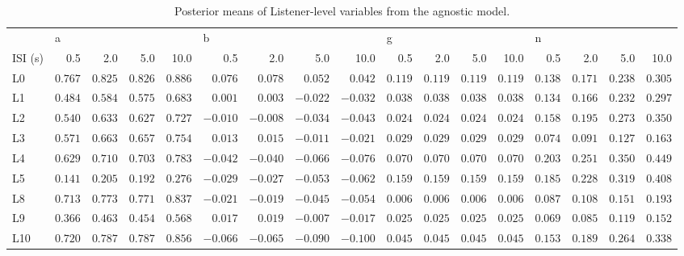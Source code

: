 \begin{table} \centering \caption{Posterior means of Listener-level variables from the agnostic model.} \label{vars} \begin{tabular}{lrrrrrrrrrrrrrrrr} \toprule {} & \multicolumn{4}{l}{a} & \multicolumn{4}{l}{b} & \multicolumn{4}{l}{g} & \multicolumn{4}{l}{n} \\ ISI (s) & 0.5 & 2.0 & 5.0 & 10.0 & 0.5 & 2.0 & 5.0 & 10.0 & 0.5 & 2.0 & 5.0 & 10.0 & 0.5 & 2.0 & 5.0 & 10.0 \\ \midrule L0 & $0.767$ & $0.825$ & $0.826$ & $0.886$ & $0.076$ & $0.078$ & $0.052$ & $0.042$ & $0.119$ & $0.119$ & $0.119$ & $0.119$ & $0.138$ & $0.171$ & $0.238$ & $0.305$ \\ L1 & $0.484$ & $0.584$ & $0.575$ & $0.683$ & $0.001$ & $0.003$ & $-0.022$ & $-0.032$ & $0.038$ & $0.038$ & $0.038$ & $0.038$ & $0.134$ & $0.166$ & $0.232$ & $0.297$ \\ L2 & $0.540$ & $0.633$ & $0.627$ & $0.727$ & $-0.010$ & $-0.008$ & $-0.034$ & $-0.043$ & $0.024$ & $0.024$ & $0.024$ & $0.024$ & $0.158$ & $0.195$ & $0.273$ & $0.350$ \\ L3 & $0.571$ & $0.663$ & $0.657$ & $0.754$ & $0.013$ & $0.015$ & $-0.011$ & $-0.021$ & $0.029$ & $0.029$ & $0.029$ & $0.029$ & $0.074$ & $0.091$ & $0.127$ & $0.163$ \\ L4 & $0.629$ & $0.710$ & $0.703$ & $0.783$ & $-0.042$ & $-0.040$ & $-0.066$ & $-0.076$ & $0.070$ & $0.070$ & $0.070$ & $0.070$ & $0.203$ & $0.251$ & $0.350$ & $0.449$ \\ L5 & $0.141$ & $0.205$ & $0.192$ & $0.276$ & $-0.029$ & $-0.027$ & $-0.053$ & $-0.062$ & $0.159$ & $0.159$ & $0.159$ & $0.159$ & $0.185$ & $0.228$ & $0.319$ & $0.408$ \\ L8 & $0.713$ & $0.773$ & $0.771$ & $0.837$ & $-0.021$ & $-0.019$ & $-0.045$ & $-0.054$ & $0.006$ & $0.006$ & $0.006$ & $0.006$ & $0.087$ & $0.108$ & $0.151$ & $0.193$ \\ L9 & $0.366$ & $0.463$ & $0.454$ & $0.568$ & $0.017$ & $0.019$ & $-0.007$ & $-0.017$ & $0.025$ & $0.025$ & $0.025$ & $0.025$ & $0.069$ & $0.085$ & $0.119$ & $0.152$ \\ L10 & $0.720$ & $0.787$ & $0.787$ & $0.856$ & $-0.066$ & $-0.065$ & $-0.090$ & $-0.100$ & $0.045$ & $0.045$ & $0.045$ & $0.045$ & $0.153$ & $0.189$ & $0.264$ & $0.338$ \\ \bottomrule \end{tabular} \end{table}